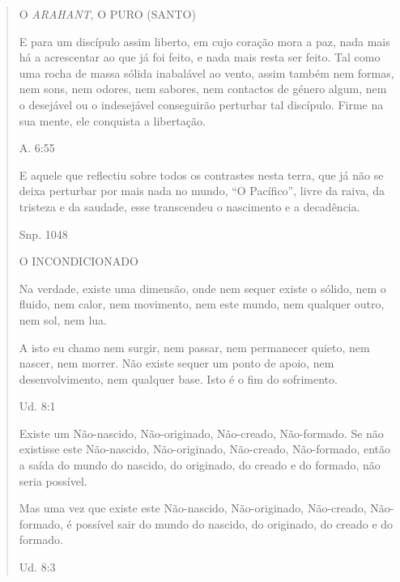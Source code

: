 \begin{quote}
O \emph{ARAHANT}, O PURO (SANTO)

E para um discípulo assim liberto, em cujo coração mora a paz, nada mais há a acrescentar ao que já foi feito, e nada mais resta ser feito. Tal como uma rocha de massa sólida inabalável ao vento, assim também nem formas, nem sons, nem odores, nem sabores, nem contactos de género algum, nem o desejável ou o indesejável conseguirão perturbar tal discípulo. Firme na sua mente, ele conquista a libertação.

A. 6:55

E aquele que reflectiu sobre todos os contrastes nesta terra, que já não se deixa perturbar por mais nada no mundo, ``O Pacífico'', livre da raiva, da tristeza e da saudade, esse transcendeu o nascimento e a decadência.

Snp. 1048

O INCONDICIONADO

Na verdade, existe uma dimensão, onde nem sequer existe o sólido, nem o fluido, nem calor, nem movimento, nem este mundo, nem qualquer outro, nem sol, nem lua.

A isto eu chamo nem surgir, nem passar, nem permanecer quieto, nem nascer, nem morrer. Não existe sequer um ponto de apoio, nem desenvolvimento, nem qualquer base. Isto é o fim do sofrimento.

Ud. 8:1

Existe um Não-nascido, Não-originado, Não-creado, Não-formado. Se não existisse este Não-nascido, Não-originado, Não-creado, Não-formado, então a saída do mundo do nascido, do originado, do creado e do formado, não seria possível.

Mas uma vez que existe este Não-nascido, Não-originado, Não-creado, Não-formado, é possível sair do mundo do nascido, do originado, do creado e do formado.

Ud. 8:3
\end{quote}
